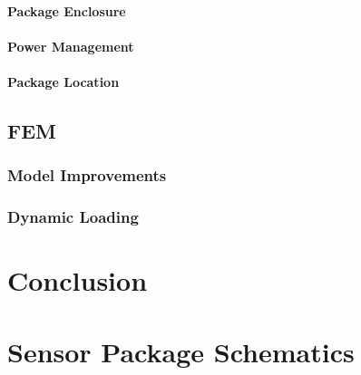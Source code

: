 \documentclass[12pt]{report}
\begin{document}
			\subsubsection{Package Enclosure}
			\subsubsection{Power Management}
			\subsubsection{Package Location}
	\section{FEM}
		\subsection{Model Improvements}
		\subsection{Dynamic Loading}
\chapter{Conclusion}

\appendix

\chapter{Sensor Package Schematics}
\label{app:Schematic}

\end{document}
